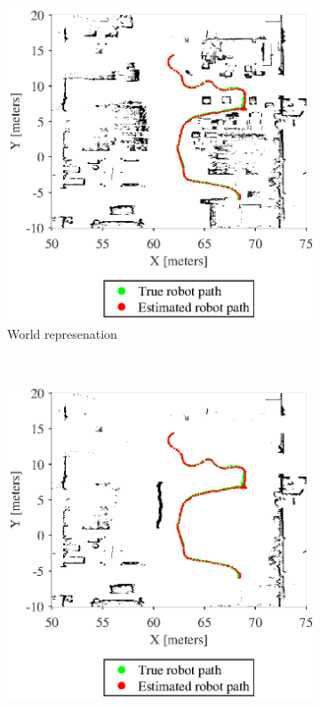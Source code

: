 \begin{figure}
	\centering
	\begin{subfigure}[b]{0.45\textwidth}
		\includegraphics[width=\textwidth]{figures/static_mapping/map_with_poses}
		\caption{World represenation}
		\label{fig:simulated_small_world}
	\end{subfigure}
	~ %
	\begin{subfigure}[b]{0.45\textwidth}
		\includegraphics[width=\textwidth]{figures/static_mapping/amcl_map_with_poses}

\end{subfigure}
\end{figure}
